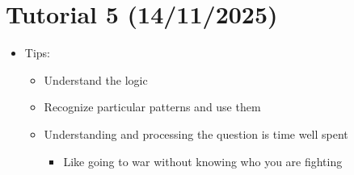 \documentclass{article}
\begin{document}
\section{Tutorial 5 (14/11/2025)}
\begin{itemize}
    \item Tips:
    \begin{itemize}
        \item Understand the logic
        \item Recognize particular patterns and use them
        \item Understanding and processing the question is time well spent
        \begin{itemize}
            \item Like going to war without knowing who you are fighting
        \end{itemize}
    \end{itemize}

\end{itemize}
\end{document}
